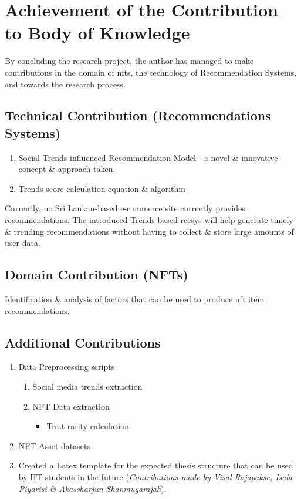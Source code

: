 \section{Achievement of the Contribution to Body of Knowledge}

By concluding the research project, the author has managed to make contributions in the domain of \gls{nft}s, the technology of Recommendation Systems, and towards the research process.

\subsection{Technical Contribution (Recommendations Systems)}

\begin{enumerate}
\item Social Trends influenced Recommendation Model - a novel \& innovative concept \& approach taken.
\item Trends-score calculation equation \& algorithm
\end{enumerate}

\noindent Currently, no Sri Lankan-based e-commerce site currently provides recommendations. The introduced Trends-based \gls{recsys} will help generate timely \& trending recommendations without having to collect \& store large amounts of user data.

\subsection{Domain Contribution (NFTs)}
Identification \& analysis of factors that can be used to produce \gls{nft} item recommendations.

\subsection{Additional Contributions}
\begin{enumerate}
\item Data Preprocessing scripts
    \begin{enumerate}
        \item Social media trends extraction
        \item NFT Data extraction
        \begin{itemize}
            \item Trait rarity calculation
        \end{itemize}
     \end{enumerate}
     
\item NFT Asset datasets
\item Created a Latex template for the expected thesis structure that can be used by IIT students in the future (\textit{Contributions made by Visal Rajapakse, Isala Piyarisi \& Akassharjun Shanmugarajah}).
\end{enumerate}


